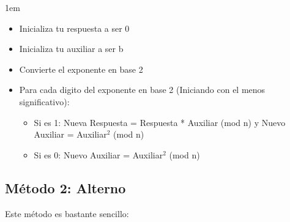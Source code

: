 \documentclass[12pt, fleqn]{report}                             %
\newenvironment{SmallIndentation}[1][0.75em]                    %
    {\begin{adjustwidth}{#1}{}\begin{footnotesize}}                 %
    {\end{footnotesize}\end{adjustwidth}}                           %
\begin{document}
                \begin{SmallIndentation}[1em]
                    
                    \begin{itemize}
                        \item   Inicializa tu respuesta a ser 0
                        \item   Inicializa tu auxiliar a ser b
                        \item   Convierte el exponente en base 2

                        \item Para cada digito del exponente en base 2 (Iniciando con
                              el menos significativo):
                            
                            \begin{itemize}
                                \item Si es 1:
                                        Nueva Respuesta = Respuesta * Auxiliar (mod n) y Nuevo Auxiliar = Auxiliar$^2$ (mod n)
                                \item Si es 0:
                                        Nuevo Auxiliar = Auxiliar$^2$ (mod n)
                            \end{itemize}
                    \end{itemize}

                \end{SmallIndentation}


            \clearpage
            \subsection*{Método 2: Alterno}

                Este método es bastante sencillo:
\end{document}
